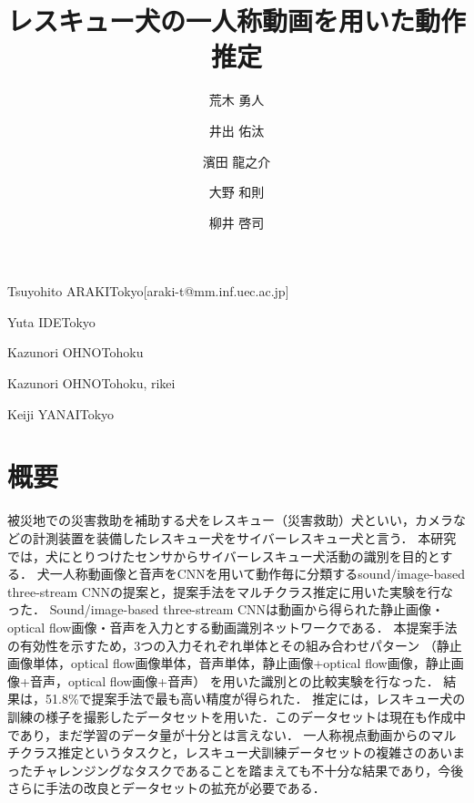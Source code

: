 \documentclass[MIRU,submit]{miru2019j}
\begin{document}
\title{レスキュー犬の一人称動画を用いた動作推定}


 \author{荒木 勇人}{Tsuyohito ARAKI}{Tokyo}[araki-t@mm.inf.uec.ac.jp]
 \author{井出 佑汰}{Yuta IDE}{Tokyo}%
 \author{濱田 龍之介}{Kazunori OHNO}{Tohoku}%
 \author{大野 和則}{Kazunori OHNO}{Tohoku, rikei}%
 \author{柳井 啓司}{Keiji YANAI}{Tokyo}%


\maketitle
\section*{概要}
被災地での災害救助を補助する犬をレスキュー（災害救助）犬といい，カメラなどの計測装置を装備したレスキュー犬をサイバーレスキュー犬と言う．
本研究では，犬にとりつけたセンサからサイバーレスキュー犬活動の識別を目的とする．
犬一人称動画像と音声をCNNを用いて動作毎に分類するsound/image-based three-stream CNNの提案と，提案手法をマルチクラス推定に用いた実験を行なった．
Sound/image-based three-stream CNNは動画から得られた静止画像・optical flow画像・音声を入力とする動画識別ネットワークである．
本提案手法の有効性を示すため，3つの入力それぞれ単体とその組み合わせパターン
（静止画像単体，optical flow画像単体，音声単体，静止画像+optical flow画像，静止画像+音声，optical flow画像+音声）
を用いた識別との比較実験を行なった．
結果は，51.8\%で提案手法で最も高い精度が得られた．
推定には，レスキュー犬の訓練の様子を撮影したデータセットを用いた．このデータセットは現在も作成中であり，まだ学習のデータ量が十分とは言えない．
一人称視点動画からのマルチクラス推定というタスクと，レスキュー犬訓練データセットの複雑さのあいまったチャレンジングなタスクであることを踏まえても不十分な結果であり，今後さらに手法の改良とデータセットの拡充が必要である．
\end{document}
